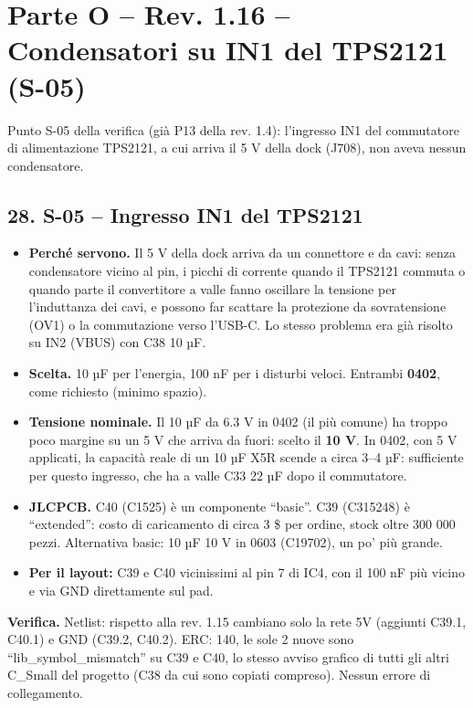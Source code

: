 \clearpage
\section[Parte O – Rev. 1.16 – Condensatori su IN1 del TPS2121 (S-05)]{Parte O – Rev. 1.16 – Condensatori su IN1 del TPS2121 (S-05)}

Punto S-05 della verifica  (già P13 della rev. 1.4): l'ingresso IN1 del commutatore di alimentazione TPS2121, a cui arriva il 5 V della dock (J708), non aveva nessun condensatore.

\subsection[28. S-05 – Ingresso IN1 del TPS2121]{28. S-05 – Ingresso IN1 del TPS2121 }

\begin{itemize}
\item \textbf{Perché servono.} Il 5 V della dock arriva da un connettore e da cavi: senza condensatore vicino al pin, i picchi di corrente quando il TPS2121 commuta o quando parte il convertitore a valle fanno oscillare la tensione per l'induttanza dei cavi, e possono far scattare la protezione da sovratensione (OV1) o la commutazione verso l'USB-C. Lo stesso problema era già risolto su IN2 (VBUS) con C38 10 µF.
\item \textbf{Scelta.} 10 µF per l'energia, 100 nF per i disturbi veloci. Entrambi \textbf{0402}, come richiesto (minimo spazio).
\item \textbf{Tensione nominale.} Il 10 µF da 6.3 V in 0402 (il più comune) ha troppo poco margine su un 5 V che arriva da fuori: scelto il \textbf{10 V}. In 0402, con 5 V applicati, la capacità reale di un 10 µF X5R scende a circa 3–4 µF: sufficiente per questo ingresso, che ha a valle C33 22 µF dopo il commutatore.
\item \textbf{JLCPCB.} C40 (C1525) è un componente \textquotedblleft{}basic\textquotedblright{}. C39 (C315248) è \textquotedblleft{}extended\textquotedblright{}: costo di caricamento di circa 3 \$ per ordine, stock oltre 300 000 pezzi. Alternativa basic: 10 µF 10 V in 0603 (C19702), un po' più grande.
\item \textbf{Per il layout:} C39 e C40 vicinissimi al pin 7 di IC4, con il 100 nF più vicino e via GND direttamente sul pad.
\end{itemize}

\textbf{Verifica.} Netlist: rispetto alla rev. 1.15 cambiano solo la rete 5V (aggiunti C39.1, C40.1) e GND (C39.2, C40.2). ERC: 140, le sole 2 nuove sono \textquotedblleft{}lib\_\allowbreak{}symbol\_\allowbreak{}mismatch\textquotedblright{} su C39 e C40, lo stesso avviso grafico di tutti gli altri C\_\allowbreak{}Small del progetto (C38 da cui sono copiati compreso). Nessun errore di collegamento.
